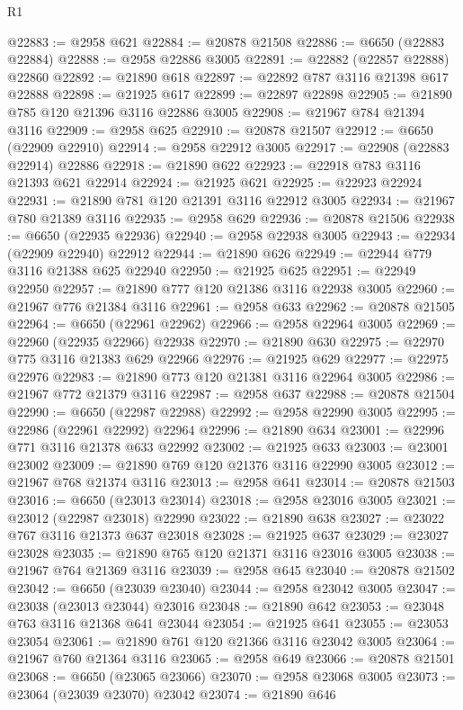 \begin{lexlean}{R1}
\begin{coremodule}
@22883 := @2958 @621
@22884 := @20878 @21508
@22886 := @6650 (@22883 @22884)
@22888 := @2958 @22886 @3005
@22891 := @22882 (@22857 @22888) @22860
@22892 := @21890 @618
@22897 := @22892 @787 @3116 @21398 @617 @22888
@22898 := @21925 @617
@22899 := @22897 @22898
@22905 := @21890 @785 @120 @21396 @3116 @22886 @3005
@22908 := @21967 @784 @21394 @3116
@22909 := @2958 @625
@22910 := @20878 @21507
@22912 := @6650 (@22909 @22910)
@22914 := @2958 @22912 @3005
@22917 := @22908 (@22883 @22914) @22886
@22918 := @21890 @622
@22923 := @22918 @783 @3116 @21393 @621 @22914
@22924 := @21925 @621
@22925 := @22923 @22924
@22931 := @21890 @781 @120 @21391 @3116 @22912 @3005
@22934 := @21967 @780 @21389 @3116
@22935 := @2958 @629
@22936 := @20878 @21506
@22938 := @6650 (@22935 @22936)
@22940 := @2958 @22938 @3005
@22943 := @22934 (@22909 @22940) @22912
@22944 := @21890 @626
@22949 := @22944 @779 @3116 @21388 @625 @22940
@22950 := @21925 @625
@22951 := @22949 @22950
@22957 := @21890 @777 @120 @21386 @3116 @22938 @3005
@22960 := @21967 @776 @21384 @3116
@22961 := @2958 @633
@22962 := @20878 @21505
@22964 := @6650 (@22961 @22962)
@22966 := @2958 @22964 @3005
@22969 := @22960 (@22935 @22966) @22938
@22970 := @21890 @630
@22975 := @22970 @775 @3116 @21383 @629 @22966
@22976 := @21925 @629
@22977 := @22975 @22976
@22983 := @21890 @773 @120 @21381 @3116 @22964 @3005
@22986 := @21967 @772 @21379 @3116
@22987 := @2958 @637
@22988 := @20878 @21504
@22990 := @6650 (@22987 @22988)
@22992 := @2958 @22990 @3005
@22995 := @22986 (@22961 @22992) @22964
@22996 := @21890 @634
@23001 := @22996 @771 @3116 @21378 @633 @22992
@23002 := @21925 @633
@23003 := @23001 @23002
@23009 := @21890 @769 @120 @21376 @3116 @22990 @3005
@23012 := @21967 @768 @21374 @3116
@23013 := @2958 @641
@23014 := @20878 @21503
@23016 := @6650 (@23013 @23014)
@23018 := @2958 @23016 @3005
@23021 := @23012 (@22987 @23018) @22990
@23022 := @21890 @638
@23027 := @23022 @767 @3116 @21373 @637 @23018
@23028 := @21925 @637
@23029 := @23027 @23028
@23035 := @21890 @765 @120 @21371 @3116 @23016 @3005
@23038 := @21967 @764 @21369 @3116
@23039 := @2958 @645
@23040 := @20878 @21502
@23042 := @6650 (@23039 @23040)
@23044 := @2958 @23042 @3005
@23047 := @23038 (@23013 @23044) @23016
@23048 := @21890 @642
@23053 := @23048 @763 @3116 @21368 @641 @23044
@23054 := @21925 @641
@23055 := @23053 @23054
@23061 := @21890 @761 @120 @21366 @3116 @23042 @3005
@23064 := @21967 @760 @21364 @3116
@23065 := @2958 @649
@23066 := @20878 @21501
@23068 := @6650 (@23065 @23066)
@23070 := @2958 @23068 @3005
@23073 := @23064 (@23039 @23070) @23042
@23074 := @21890 @646

\end{coremodule}
\end{lexlean}
